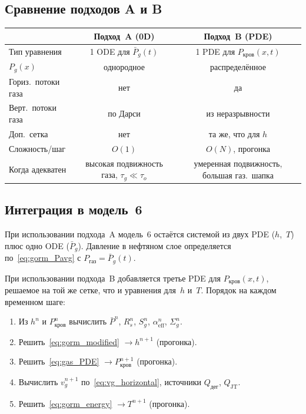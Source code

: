 \documentclass[12pt,a4paper]{article}
\begin{document}
\subsection{Сравнение подходов A и B}

\begin{center}
\renewcommand{\arraystretch}{1.3}
\begin{tabular}{|l|c|c|}
  \hline
  & \textbf{Подход~A (0D)} & \textbf{Подход~B (PDE)} \\
  \hline
  Тип уравнения      & 1 ODE для $\bar{P}_g(t)$
                      & 1 PDE для $P_{\text{кров}}(x,t)$ \\
  $P_g(x)$           & однородное
                      & распределённое \\
  Гориз.\ потоки газа & нет  & да \\
  Верт.\ потоки газа  & по Дарси & из неразрывности \\
  Доп.\ сетка         & нет  & та же, что для $h$ \\
  Сложность/шаг       & $O(1)$ & $O(N)$, прогонка \\
  Когда адекватен     & высокая подвижность газа,
                        $\tau_g \ll \tau_o$
                      & умеренная подвижность,
                        большая газ.\ шапка \\
  \hline
\end{tabular}
\end{center}

\subsection{Интеграция в модель~6}

При использовании подхода~A модель~6 остаётся системой из двух PDE
($h$,~$T$) плюс одно ODE ($\bar{P}_g$). Давление в нефтяном слое
определяется по~\eqref{eq:gorm_Pavg} с $P_{\text{газ}} = \bar{P}_g(t)$.

При использовании подхода~B добавляется третье PDE
для $P_{\text{кров}}(x,t)$, решаемое на той же сетке, что
и уравнения для~$h$ и~$T$. Порядок на каждом временном шаге:
\begin{enumerate}[nosep]
  \item Из $h^n$ и $P_{\text{кров}}^n$ вычислить $\bar{P}^n$,
        $R_s^n$, $S_g^n$, $\alpha_{\mathrm{eff}}^n$, $\Sigma_g^n$.
  \item Решить~\eqref{eq:gorm_modified} $\to h^{n+1}$
        (прогонка).
  \item Решить~\eqref{eq:gas_PDE} $\to P_{\text{кров}}^{n+1}$
        (прогонка).
  \item Вычислить $v_g^{n+1}$ по~\eqref{eq:vg_horizontal},
        источники $Q_{\text{дег}}$, $Q_{\mathrm{JT}}$.
  \item Решить~\eqref{eq:gorm_energy} $\to T^{n+1}$
        (прогонка).
\end{enumerate}
\end{document}
